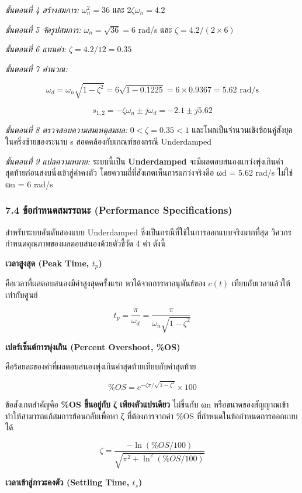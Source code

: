 \textit{ขั้นตอนที่ 4 สร้างสมการ:} $\omega_n^2 = 36$ และ $2\zeta\omega_n = 4.2$

\textit{ขั้นตอนที่ 5 จัดรูปสมการ:} $\omega_n = \sqrt{36} = 6$ rad/s และ $\zeta = 4.2/(2\times 6)$

\textit{ขั้นตอนที่ 6 แทนค่า:} $\zeta = 4.2/12 = 0.35$

\textit{ขั้นตอนที่ 7 คำนวณ:}

\[
\omega_d = \omega_n\sqrt{1-\zeta^2} = 6\sqrt{1-0.1225} = 6\times 0.9367 = 5.62 \text{ rad/s}
\]

\[
s_{1,2} = -\zeta\omega_n \pm j\omega_d = -2.1 \pm j5.62
\]

\textit{ขั้นตอนที่ 8 ตรวจสอบความสมเหตุสมผล:} $0 < \zeta = 0.35 < 1$ และโพลเป็นจำนวนเชิงซ้อนคู่สังยุคในครึ่งซ้ายของระนาบ s สอดคล้องกับเกณฑ์ของกรณี Underdamped

\textit{ขั้นตอนที่ 9 แปลความหมาย:} ระบบนี้เป็น \textbf{Underdamped} จะมีผลตอบสนองแกว่งพุ่งเกินค่าสุดท้ายก่อนสงบนิ่งเข้าสู่ค่าคงตัว โดยความถี่ที่สังเกตเห็นการแกว่งจริงคือ ωd = 5.62 rad/s ไม่ใช่ ωn = 6 rad/s


\subsubsection{7.4 ข้อกำหนดสมรรถนะ (Performance Specifications)}

สำหรับระบบอันดับสองแบบ Underdamped ซึ่งเป็นกรณีที่ใช้ในการออกแบบจริงมากที่สุด วิศวกรกำหนดคุณภาพของผลตอบสนองด้วยตัวชี้วัด 4 ค่า ดังนี้

\textbf{เวลาสูงสุด (Peak Time, $t_p$)}

คือเวลาที่ผลตอบสนองมีค่าสูงสุดครั้งแรก หาได้จากการหาอนุพันธ์ของ $c(t)$ เทียบกับเวลาแล้วให้เท่ากับศูนย์

\[
t_p = \frac{\pi}{\omega_d} = \frac{\pi}{\omega_n\sqrt{1-\zeta^2}}
\]

\textbf{เปอร์เซ็นต์การพุ่งเกิน (Percent Overshoot, \%OS)}

คือร้อยละของค่าที่ผลตอบสนองพุ่งเกินค่าสุดท้ายเทียบกับค่าสุดท้าย

\[
\%OS = e^{-\zeta\pi/\sqrt{1-\zeta^2}} \times 100
\]

ข้อสังเกตสำคัญคือ \textbf{\%OS ขึ้นอยู่กับ ζ เพียงตัวแปรเดียว} ไม่ขึ้นกับ ωn หรือขนาดของสัญญาณเข้า ทำให้สามารถแก้สมการย้อนกลับเพื่อหา ζ ที่ต้องการจากค่า \%OS ที่กำหนดในข้อกำหนดการออกแบบได้

\[
\zeta = \frac{-\ln(\%OS/100)}{\sqrt{\pi^2 + \ln^2(\%OS/100)}}
\]

\textbf{เวลาเข้าสู่ภาวะคงตัว (Settling Time, $t_s$)}


